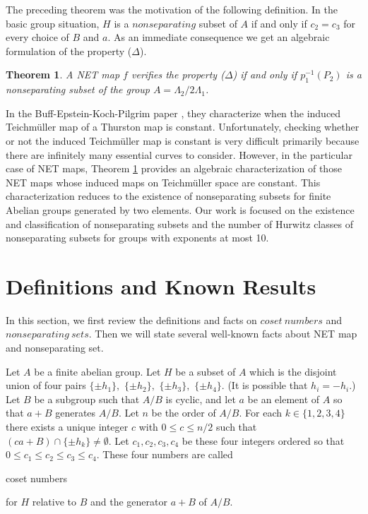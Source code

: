 \documentclass[article,dvisp]{amsart}
\newtheorem{thm}{Theorem}[section]
\theoremstyle{definition}
\theoremstyle{remark}
\numberwithin{equation}{section}
\theoremstyle{lemma}
\begin{document}
The preceding theorem was the motivation of the following definition. In the basic group situation, $H$ is a $nonseparating$ subset of $A$ if and only if $c_{2}=c_{3}$ for every choice of $B$ and $a$. As an immediate consequence we get an algebraic formulation of the property ($\Delta$).

\begin{thm}\label{teo:3} A NET map $f$ verifies the property ($\Delta$) if and only if $p^{-1}_{1}(P_{2})$ is a nonseparating subset of the group $A=\Lambda_{2}/2\Lambda_{1}$.\end{thm}

In the Buff-Epstein-Koch-Pilgrim paper \cite{BEKP}, they characterize when the induced Teichm\"uller map of a Thurston map is constant. Unfortunately, checking whether or not the induced Teichm\"uller map is constant is very difficult primarily because there are infinitely many essential curves to
consider. However, in the particular case of NET maps, Theorem \ref{teo:3} provides an algebraic characterization of those NET maps whose induced maps on Teichm\"uller space are constant. This characterization reduces to the existence of nonseparating subsets for finite Abelian groups generated by two elements. Our work is focused on the existence and classification of nonseparating subsets and the number of Hurwitz classes of nonseparating subsets for groups with exponents at most 10.

\section{Definitions and Known Results}

In this section, we first review the definitions and facts on $coset\ numbers$ and $nonseparating\ sets$. Then we will state several well-known facts about NET map and nonseparating set.

Let $A$ be a finite abelian group. Let $H$ be a subset of $A$ which is the disjoint union of four pairs $\{\pm h_{1}\},$ $\{\pm h_{2}\},$ $\{\pm h_{3}\},$ $\{\pm h_{4}\}$. (It is possible that $h_{i}=-h_{i}$.) Let $B$ be a subgroup such that $A/B$ is cyclic, and let $a$ be an element of $A$ so that $a+B$ generates $A/B$. Let $n$ be the order of $A/B$. For each $k\in\{1,2,3,4\}$ there exists a unique integer $c$ with $0\leq c\leq n/2$ such that $(ca+B)\cap\{\pm h_{k}\}\neq\emptyset$.
Let $c_{1},c_{2},c_{3},c_{4}$ be these four integers ordered so that $0\leq c_{1}\leq c_{2}\leq c_{3}\leq c_{4}$. These four numbers are called \begin{em}coset numbers\end{em} for $H$ relative to $B$ and the generator $a+B$ of $A/B$.
\end{document}
